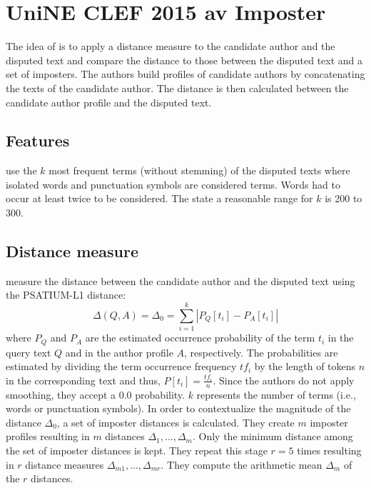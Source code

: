 \section{UniNE CLEF 2015 \ac{av} Imposter}
\label{sec:UniNE_CLEF2015_AV_imposter}

The idea of \cite{kocher_unine_2015} is to apply a distance measure to the candidate author and the disputed text and 
compare the distance to those between the disputed text and a set of imposters.
The authors build profiles of candidate authors by concatenating the texts of the candidate author.
The distance is then calculated between the candidate author profile and the disputed text.

\subsection{Features}

\citet{kocher_unine_2015} use the $k$ most frequent terms (without stemming) of the disputed texts 
where isolated words and punctuation symbols are considered terms.
Words had to occur at least twice to be considered.
The state a reasonable range for $k$ is 200 to 300.


\subsection{Distance measure}

\citet{kocher_unine_2015} measure the distance between the candidate author and the disputed text using the PSATIUM-L1 distance:
$$\Delta(Q,A)=\Delta_0=\sum_{i=1}^{k}\left| P_Q\left[ t_i \right] -P_A\left[ t_i \right] \right|$$
where $P_Q$ and $P_A$ are the estimated occurrence probability of the term $t_i$ in the query text $Q$ and in the author profile $A$, respectively.
The probabilities are estimated by dividing the term occurrence frequency $tf_i$ by the length of tokens $n$ in the corresponding text and thus, 
$P\left[ t_i \right]=\frac{tf_i}{n}$.
Since the authors do not apply smoothing, they accept a 0.0 probability.
$k$ represents the number of terms (i.e., words or punctuation symbols).
In order to contextualize the magnitude of the distance $\Delta_0$, a set of imposter distances is calculated.
They create $m$ imposter profiles resulting in $m$ distances $\Delta_1, \ldots, \Delta_m$.
Only the minimum distance among the set of imposter distances is kept.
They repeat this stage $r=5$ times resulting in $r$ distance measures $\Delta_{m1}, \ldots, \Delta_{mr}$.
They compute the arithmetic mean $\Delta_m$ of the $r$ distances.

